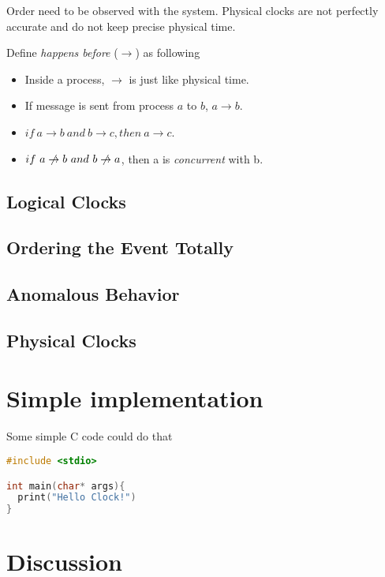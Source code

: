 \documentclass[12pt,a4paper,oneside]{article}
\begin{document}
Order need to be observed with the system.
Physical clocks are not perfectly accurate and do not keep precise physical time\cite{l}.

Define \textit{happens before} ($\rightarrow$) as following

\begin{itemize}
  \item Inside a process, $\rightarrow$ is just like physical time.
  \item If message is sent from process $a$ to $b$, $a \rightarrow b$.
  \item $if\ a \rightarrow b\ and\ b \rightarrow c, then\ a \rightarrow c$.
  \item $if\ a \centernot\rightarrow b\ and\ b \centernot\rightarrow a$, then a is \textit{concurrent} with b.
\end{itemize}

\subsection{Logical Clocks}

\subsection{Ordering the Event Totally}

\subsection{Anomalous Behavior}

\subsection{Physical Clocks}

\section{Simple implementation}

Some simple C code could do that

\begin{lstlisting}[language=C]
#include <stdio>

int main(char* args){
  print("Hello Clock!")
}
\end{lstlisting}

\section{Discussion}
\end{document}
